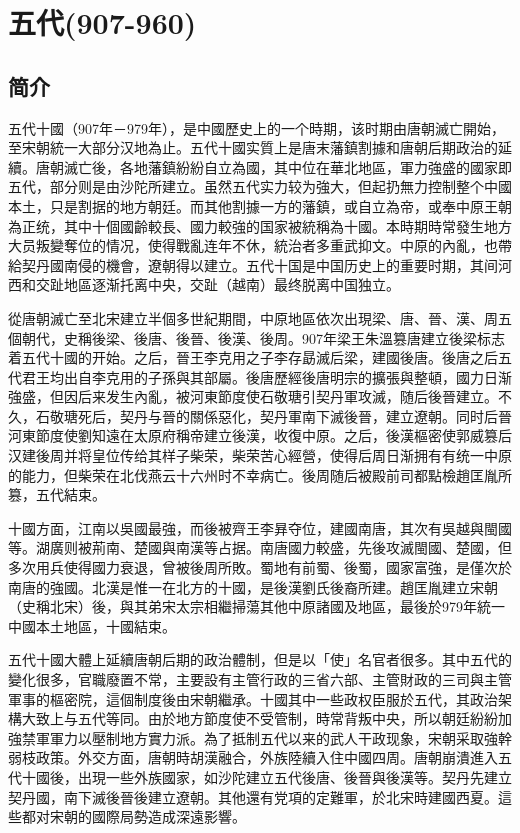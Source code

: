 
\chapter{五代\tiny(907-960)}

\section{简介}

五代十國（907年－979年），是中國歷史上的一个時期，该时期由唐朝滅亡開始，至宋朝統一大部分汉地為止。五代十國实質上是唐末藩鎮割據和唐朝后期政治的延續。唐朝滅亡後，各地藩鎮紛紛自立為國，其中位在華北地區，軍力強盛的國家即五代，部分则是由沙陀所建立。虽然五代实力较为強大，但起扔無力控制整个中國本土，只是割据的地方朝廷。而其他割據一方的藩鎮，或自立為帝，或奉中原王朝為正统，其中十個國齡較長、國力較強的国家被統稱為十國。本時期時常發生地方大员叛變奪位的情况，使得戰亂连年不休，統治者多重武抑文。中原的內亂，也帶給契丹國南侵的機會，遼朝得以建立。五代十国是中国历史上的重要时期，其间河西和交趾地區逐渐托离中央，交趾（越南）最终脱离中国独立。

從唐朝滅亡至北宋建立半個多世紀期間，中原地區依次出現梁、唐、晉、漢、周五個朝代，史稱後梁、後唐、後晉、後漢、後周。907年梁王朱溫篡唐建立後梁标志着五代十國的开始。之后，晉王李克用之子李存勗滅后梁，建國後唐。後唐之后五代君王均出自李克用的子孫與其部屬。後唐歷經後唐明宗的擴張與整頓，國力日渐強盛，但因后来发生內亂，被河東節度使石敬瑭引契丹軍攻滅，随后後晉建立。不久，石敬瑭死后，契丹与晉的關係惡化，契丹軍南下滅後晉，建立遼朝。同时后晉河東節度使劉知遠在太原府稱帝建立後漢，收復中原。之后，後漢樞密使郭威篡后汉建後周并将皇位传给其样子柴荣，柴荣苦心經營，使得后周日渐拥有有统一中原的能力，但柴荣在北伐燕云十六州时不幸病亡。後周随后被殿前司都點檢趙匡胤所篡，五代結束。

十國方面，江南以吳國最強，而後被齊王李昪夺位，建國南唐，其次有吳越與閩國等。湖廣则被荊南、楚國與南漢等占据。南唐國力較盛，先後攻滅閩國、楚國，但多次用兵使得國力衰退，曾被後周所敗。蜀地有前蜀、後蜀，國家富強，是僅次於南唐的強國。北漢是惟一在北方的十國，是後漢劉氏後裔所建。趙匡胤建立宋朝（史稱北宋）後，與其弟宋太宗相繼掃蕩其他中原諸國及地區，最後於979年統一中國本土地區，十國結束。

五代十國大體上延續唐朝后期的政治體制，但是以「使」名官者很多。其中五代的變化很多，官職廢置不常，主要設有主管行政的三省六部、主管財政的三司與主管軍事的樞密院，這個制度後由宋朝繼承。十國其中一些政权臣服於五代，其政治架構大致上与五代等同。由於地方節度使不受管制，時常背叛中央，所以朝廷紛紛加強禁軍軍力以壓制地方實力派。為了抵制五代以来的武人干政现象，宋朝采取強幹弱枝政策。外交方面，唐朝時胡漢融合，外族陸續入住中國四周。唐朝崩潰進入五代十國後，出現一些外族國家，如沙陀建立五代後唐、後晉與後漢等。契丹先建立契丹國，南下滅後晉後建立遼朝。其他還有党項的定難軍，於北宋時建國西夏。這些都对宋朝的國際局勢造成深遠影響。

